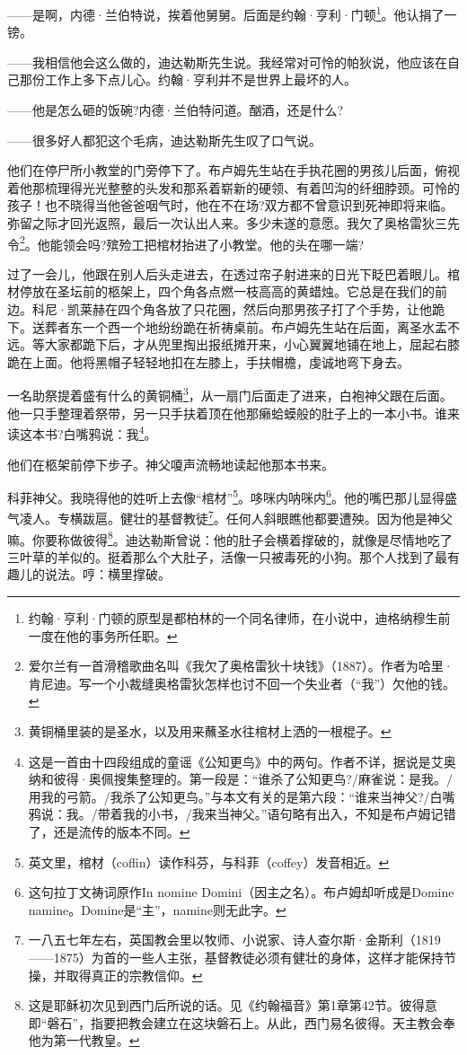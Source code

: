 \par ——是啊，内德·兰伯特说，挨着他舅舅。后面是约翰·亨利·门顿\footnote{约翰·亨利·门顿的原型是都柏林的一个同名律师，在小说中，迪格纳穆生前一度在他的事务所任职。}。他认捐了一镑。
\par ——我相信他会这么做的，迪达勒斯先生说。我经常对可怜的帕狄说，他应该在自己那份工作上多下点儿心。约翰·亨利并不是世界上最坏的人。
\par ——他是怎么砸的饭碗?内德·兰伯特问道。酗酒，还是什么?
\par ——很多好人都犯这个毛病，迪达勒斯先生叹了口气说。
\par 他们在停尸所小教堂的门旁停下了。布卢姆先生站在手执花圈的男孩儿后面，俯视着他那梳理得光光整整的头发和那系着崭新的硬领、有着凹沟的纤细脖颈。可怜的孩子！也不晓得当他爸爸咽气时，他在不在场?双方都不曾意识到死神即将来临。弥留之际才回光返照，最后一次认出人来。多少未遂的意愿。我欠了奥格雷狄三先令\footnote{爱尔兰有一首滑稽歌曲名叫《我欠了奥格雷狄十块钱》（1887）。作者为哈里·肯尼迪。写一个小裁缝奥格雷狄怎样也讨不回一个失业者（“我”）欠他的钱。}。他能领会吗?殡殓工把棺材抬进了小教堂。他的头在哪一端?
\par 过了一会儿，他跟在别人后头走进去，在透过帘子射进来的日光下眨巴着眼儿。棺材停放在圣坛前的柩架上，四个角各点燃一枝高高的黄蜡烛。它总是在我们的前边。科尼·凯莱赫在四个角各放了只花圈，然后向那男孩子打了个手势，让他跪下。送葬者东一个西一个地纷纷跪在祈祷桌前。布卢姆先生站在后面，离圣水盂不远。等大家都跪下后，才从兜里掏出报纸摊开来，小心翼翼地铺在地上，屈起右膝跪在上面。他将黑帽子轻轻地扣在左膝上，手扶帽檐，虔诚地弯下身去。
\par 一名助祭提着盛有什么的黄铜桶\footnote{黄铜桶里装的是圣水，以及用来蘸圣水往棺材上洒的一根棍子。}，从一扇门后面走了进来，白袍神父跟在后面。他一只手整理着祭带，另一只手扶着顶在他那癞蛤蟆般的肚子上的一本小书。谁来读这本书?白嘴鸦说：我\footnote{这是一首由十四段组成的童谣《公知更鸟》中的两句。作者不详，据说是艾奥纳和彼得·奥佩搜集整理的。第一段是：“谁杀了公知更鸟?/麻雀说：是我。/用我的弓箭。/我杀了公知更鸟。”与本文有关的是第六段：“谁来当神父?/白嘴鸦说：我。/带着我的小书，/我来当神父。”语句略有出入，不知是布卢姆记错了，还是流传的版本不同。}。
\par 他们在柩架前停下步子。神父嗄声流畅地读起他那本书来。
\par 科菲神父。我晓得他的姓听上去像“棺材”\footnote{英文里，棺材（coffin）读作科芬，与科菲（coffey）发音相近。}。哆咪内呐咪内\footnote{这句拉丁文祷词原作In nomine Domini（因主之名）。布卢姆却听成是Domine namine。Domine是“主”，namine则无此字。}。他的嘴巴那儿显得盛气凌人。专横跋扈。健壮的基督教徒\footnote{一八五七年左右，英国教会里以牧师、小说家、诗人查尔斯·金斯利（1819——1875）为首的一些人主张，基督教徒必须有健壮的身体，这样才能保持节操，并取得真正的宗教信仰。}。任何人斜眼瞧他都要遭殃。因为他是神父嘛。你要称做彼得\footnote{这是耶稣初次见到西门后所说的话。见《约翰福音》第1章第42节。彼得意即“磐石”，指要把教会建立在这块磐石上。从此，西门易名彼得。天主教会奉他为第一代教皇。}。迪达勒斯曾说：他的肚子会横着撑破的，就像是尽情地吃了三叶草的羊似的。挺着那么个大肚子，活像一只被毒死的小狗。那个人找到了最有趣儿的说法。哼：横里撑破。
